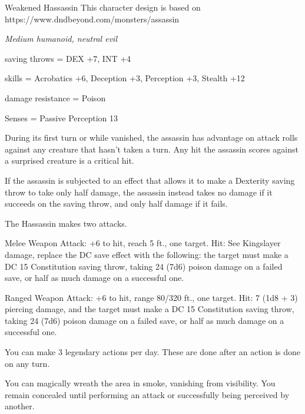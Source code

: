 \begin{monsterbox}{Weakened Hassassin}
	This character design is based on https://www.dndbeyond.com/monsters/assassin
	\begin{hangingpar}
		\textit{Medium humanoid, neutral evil}
	\end{hangingpar}
	\dndline%
	\basics[%
	armorclass = 16,
	hitpoints  = 98,
	speed      = 30 ft
	]
	\dndline%
	\stats[
	STR = \stat{11}, %
	DEX = \stat{18},
	CON = \stat{16},
	INT = \stat{13},
	WIS = \stat{11},
	CHA = \stat{10}
	]
	\dndline%
	\details[%
	languages = {Hassassin, Thieves' cant, Common},
	challenge = 10
	]
	\dndline%
	saving throws = DEX +7, INT +4
	
	skills = Acrobatics +6, Deception +3, Perception +3, Stealth +12
	
	damage resistance = Poison
	
	Senses = Passive Perception 13
	
	\dndline%
	\begin{monsteraction}[Assassinate]
		During its first turn or while vanished, the assassin has advantage on attack rolls against any creature that hasn't taken a turn. Any hit the assassin scores against a surprised creature is a critical hit.
	\end{monsteraction}	
	\begin{monsteraction}[Evasion]
		 If the assassin is subjected to an effect that allows it to make a Dexterity saving throw to take only half damage, the assassin instead takes no damage if it succeeds on the saving throw, and only half damage if it fails.		
	\end{monsteraction}	
	\begin{monsteraction}[Multiattack]
		The Hassassin makes two attacks.
	\end{monsteraction}
	\begin{monsteraction}
		Melee Weapon Attack: +6 to hit, reach 5 ft., one target. Hit: See Kingslayer damage, replace the DC save effect with the following: the target must make a DC 15 Constitution saving throw, taking 24 (7d6) poison damage on a failed save, or half as much damage on a successful one.
	\end{monsteraction}
	\begin{monsteraction}
		Ranged Weapon Attack: +6 to hit, range 80/320 ft., one target. Hit: 7 (1d8 + 3) piercing damage, and the target must make a DC 15 Constitution saving throw, taking 24 (7d6) poison damage on a failed save, or half as much damage on a successful one.
	\end{monsteraction}
	You can make 3 legendary actions per day. These are done after an action is done on any turn.
	\begin{monsteraction}[Vanish]
		You can magically wreath the area in smoke, vanishing from visibility. You remain concealed until performing an attack or successfully being perceived by another.
	\end{monsteraction}
\end{monsterbox}

